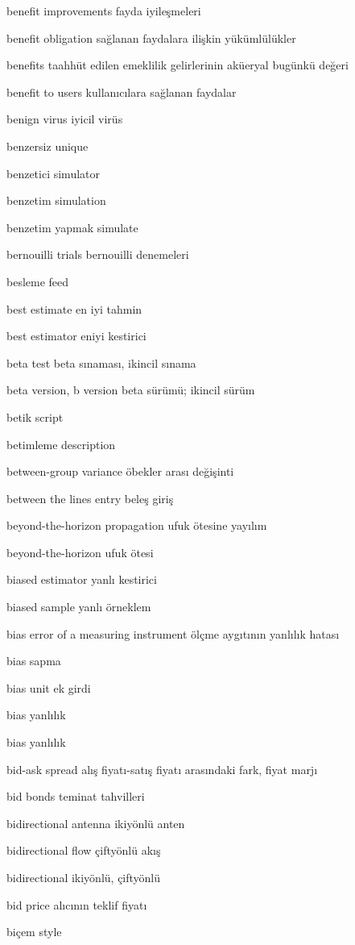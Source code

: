 \documentclass[12pt,fleqn]{article}\usepackage{../../common}
\begin{document}
benefit improvements fayda iyileşmeleri

benefit obligation sağlanan faydalara ilişkin yükümlülükler

benefits taahhüt edilen emeklilik gelirlerinin aküeryal bugünkü değeri

benefit to users kullanıcılara sağlanan faydalar

benign virus iyicil virüs

benzersiz unique

benzetici simulator

benzetim simulation

benzetim yapmak simulate

bernouilli trials bernouilli denemeleri

besleme feed

best estimate en iyi tahmin

best estimator eniyi kestirici

beta test beta sınaması, ikincil sınama

beta version, b version beta sürümü; ikincil sürüm

betik script

betimleme description

between-group variance öbekler arası değişinti

between the lines entry beleş giriş

beyond-the-horizon propagation ufuk ötesine yayılım

beyond-the-horizon ufuk ötesi

biased estimator yanlı kestirici

biased sample yanlı örneklem

bias error of a measuring instrument ölçme aygıtının yanlılık hatası

bias sapma

bias unit ek girdi

bias yanlılık

bias yanlılık

bid-ask spread alış fiyatı-satış fiyatı arasındaki fark, fiyat marjı

bid bonds teminat tahvilleri

bidirectional antenna ikiyönlü anten

bidirectional flow çiftyönlü akış

bidirectional ikiyönlü, çiftyönlü

bid price alıcının teklif fiyatı

biçem style
\end{document}
